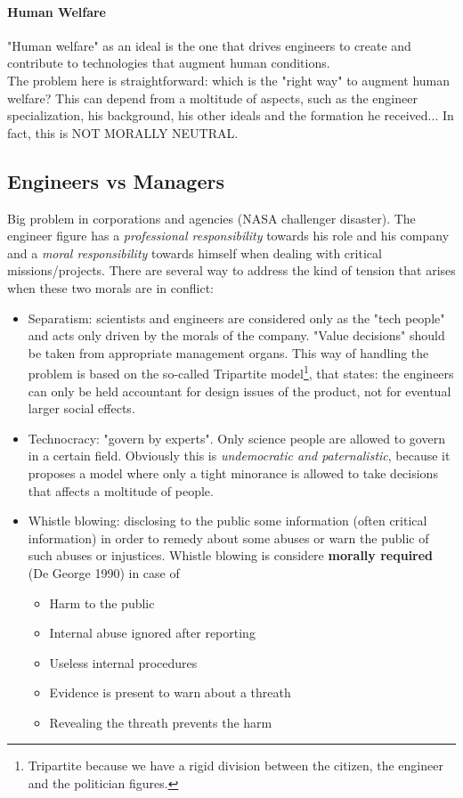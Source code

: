 \documentclass{article}
\begin{document}
			\paragraph{Human Welfare}
				"Human welfare" as an ideal is the one that drives engineers to create and contribute to technologies that augment human conditions.\\
				The problem here is straightforward: which is the "right way" to augment human welfare? This can depend from a moltitude of aspects, such as the engineer specialization, his background, his other ideals and the formation he received... In fact, this is NOT MORALLY NEUTRAL.

		\subsection{Engineers vs Managers}
			Big problem in corporations and agencies (NASA challenger disaster). The engineer figure has a \textit{professional responsibility} towards his role and his company and a \textit{moral responsibility} towards himself when dealing with critical missions/projects. There are several way to address the kind of tension that arises when these two morals are in conflict:

			\begin{itemize}
				\item Separatism: scientists and engineers are considered only as the "tech people" and acts only driven by the morals of the company. "Value decisions" should be taken from appropriate management organs. This way of handling the problem is based on the so-called Tripartite model\footnote{Tripartite because we have a rigid division between the citizen, the engineer and the politician figures.}, that states: the engineers can only be held accountant for design issues of the product, not for eventual larger social effects.
				\item Technocracy: "govern by experts". Only science people are allowed to govern in a certain field. Obviously this is \textit{undemocratic and paternalistic}, because it proposes a model where only a tight minorance is allowed to take decisions that affects a moltitude of people.
				\item Whistle blowing: disclosing to the public some information (often critical information) in order to remedy about some abuses or warn the public of such abuses or injustices. Whistle blowing is considere \textbf{morally required} (De George 1990) in case of
					\begin{itemize}
						\item Harm to the public
						\item Internal abuse ignored after reporting
						\item Useless internal procedures
						\item Evidence is present to warn about a threath
						\item Revealing the threath prevents the harm
					\end{itemize}
			\end{itemize}
			
\end{document}
